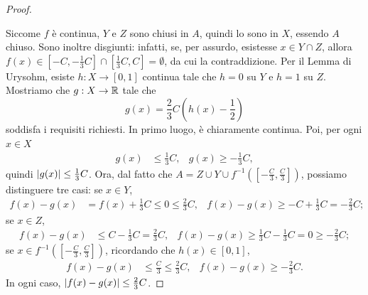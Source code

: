 \begin{proof}
\begin{center}
\begin{tikzpicture}[x=0.75pt,y=0.75pt,yscale=-1,xscale=1]
			
		\end{tikzpicture}
	\end{center}
	Siccome $f$ è continua, $Y$ e $Z$ sono chiusi in $A$, quindi lo sono in $X$, essendo $A$ chiuso. Sono inoltre disgiunti: infatti, se, per assurdo, esistesse $x \in Y \cap Z$, allora $f(x) \in [-C,-\frac{1}{3}C] \cap [\frac{1}{3}C,C] = \emptyset$, da cui la contraddizione. Per il Lemma di Urysohm, esiste $h: X \to [0,1]$ continua tale che $h=0$ su $Y$ e $h=1$ su $Z$. Mostriamo che $g: X \to \mathbb{R}$ tale che 
	\[ g(x) = \frac{2}{3}C\left( h(x)-\frac{1}{2}\right)  \]
	soddisfa i requisiti richiesti. In primo luogo, è chiaramente continua. Poi, per ogni $x \in X$
	\begin{align*}
		g(x) &\le  \frac{1}{3}C, & g(x) \ge - \frac{1}{3}C,
	\end{align*}
	quindi $\lvert g(x)\rvert\le \frac{1}{3}C$. Ora, dal fatto che $A = Z \cup Y \cup f^{-1}([-\frac{C}{3},\frac{C}{3}])$, possiamo distinguere tre casi: se $x \in Y$, 
	\begin{align*}
		f(x) - g(x) &=  f(x) + \frac{1}{3}C \le 0 \le \frac{2}{3}C, & f(x) - g(x) \ge -C + \frac{1}{3}C = -\frac{2}{3}C;
	\end{align*}
	se $x \in Z$,
	\begin{align*}
		f(x) - g(x) &\le C - \frac{1}{3}C = \frac{2}{3}C, & f(x) - g(x) \ge \frac{1}{3}C - \frac{1}{3}C = 0 \ge -\frac{2}{3}C;
	\end{align*}
	se $x\in f^{-1}([-\frac{C}{3},\frac{C}{3}])$, ricordando che $h(x) \in [0,1]$,
	\begin{align*}
		f(x) - g(x) &\le \frac{C}{3} \le \frac{2}{3}C, & f(x) - g(x) \ge -\frac{2}{3}C.
	\end{align*}
	In ogni caso, $\lvert f(x)-g(x)\rvert\le \frac{2}{3}C$. 
	

\end{proof}
